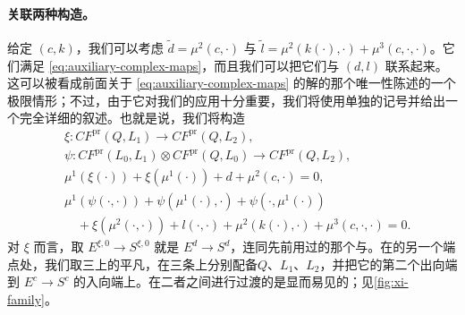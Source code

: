 \paragraph{关联两种构造。}\label{sub:relating-two-constructions}
给定 $(c,k)$，我们可以考虑 $\tilde{d}=\mu^2(c,\cdot)$ 与 $\tilde{l}=\mu^2(k(\cdot),\cdot)+\mu^3(c,\cdot,\cdot)$。它们满足 \eqref{eq:auxiliary-complex-maps}，而且我们可以把它们与 $(d,l)$ 联系起来。这可以被看成前面关于 \eqref{eq:auxiliary-complex-maps} 的解的那个唯一性陈述的一个极限情形；不过，由于它对我们的应用十分重要，我们将使用单独的记号并给出一个完全详细的叙述。也就是说，我们将构造
\begin{equation}\label{eq:xi-psi}
\boxed{\begin{aligned}
&\xi\colon CF^{\mathrm{pr}}(Q,L_1)\longrightarrow CF^{\mathrm{pr}}(Q,L_2),\\
&\psi\colon CF^{\mathrm{pr}}(L_0,L_1)\otimes CF^{\mathrm{pr}}(Q,L_0)\longrightarrow CF^{\mathrm{pr}}(Q,L_2),\\
&\mu^1(\xi(\cdot))+\xi(\mu^1(\cdot))+d+\mu^2(c,\cdot)=0,\\
&\mu^1(\psi(\cdot,\cdot))+\psi(\mu^1(\cdot),\cdot)+\psi(\cdot,\mu^1(\cdot))\\
&\quad+\xi(\mu^2(\cdot,\cdot))+l(\cdot,\cdot)+\mu^2(k(\cdot),\cdot)+\mu^3(c,\cdot,\cdot)=0.
\end{aligned}}
\end{equation}
对 $\xi$ 而言，取 $E^{\xi,0}\to S^{\xi,0}$ 就是 $E^d\to S^d$，连同先前用过的那个\trBoundaryCondition{}与\trRelative\trPerturbationDatum。在\trDeformation{}的另一个端点处，我们取三\trPointedDisc{}上的平凡\trFibration，在三条\trBoundaryComponent{}上分别配备\trBoundaryCondition{}$Q$、$L_1$、$L_2$，并把它的第二个出向端\trGluing{}到 $E^c\to S^c$ 的入向端上。在二者之间进行过渡的\trFamily{}是显而易见的；见\cref{fig:xi-family}。
